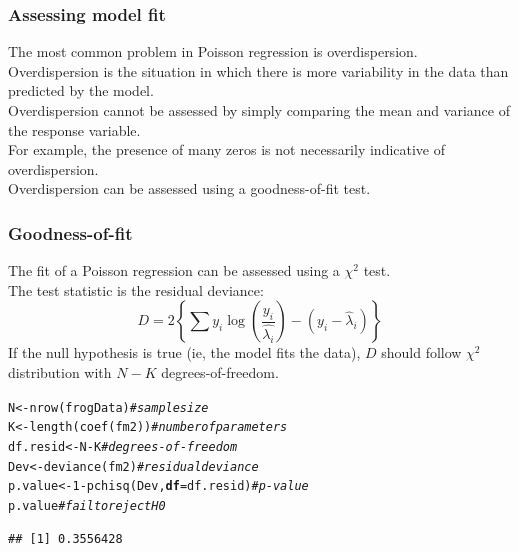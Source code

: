 \documentclass[color=usenames,dvipsnames]{beamer}\usepackage[]{graphicx}\usepackage[]{color}
\makeatletter
\newcommand{\hlnum}[1]{\textcolor[rgb]{0.69,0.494,0}{#1}}%
\newcommand{\hlcom}[1]{\textcolor[rgb]{0.514,0.506,0.514}{\textit{#1}}}%
\newcommand{\hlopt}[1]{\textcolor[rgb]{0,0,0}{#1}}%
\newcommand{\hlstd}[1]{\textcolor[rgb]{0,0,0}{#1}}%
\newcommand{\hlkwb}[1]{\textcolor[rgb]{0,0.341,0.682}{#1}}%
\newcommand{\hlkwc}[1]{\textcolor[rgb]{0,0,0}{\textbf{#1}}}%
\newcommand{\hlkwd}[1]{\textcolor[rgb]{0.004,0.004,0.506}{#1}}%
\newenvironment{kframe}{%
 \def\at@end@of@kframe{}%
 \ifinner\ifhmode%
  \def\at@end@of@kframe{\end{minipage}}%
  \begin{minipage}{\columnwidth}%
 \fi\fi%
 \def\FrameCommand##1{\hskip\@totalleftmargin \hskip-\fboxsep
 \colorbox{shadecolor}{##1}\hskip-\fboxsep
     \hskip-\linewidth \hskip-\@totalleftmargin \hskip\columnwidth}%
 \MakeFramed {\advance\hsize-\width
   \@totalleftmargin\z@ \linewidth\hsize
   \@setminipage}}%
 {\par\unskip\endMakeFramed%
 \at@end@of@kframe}
\newenvironment{knitrout}{}{} %
\makeatother
\begin{document}
\begin{frame}
  \frametitle{Assessing model fit}
  {The most common problem in Poisson regression is
    {\alert{overdispersion}}. \\}
  \pause
  \vfill
  {Overdispersion is the situation in which there is more variability
    in the data than predicted by the model. \\}
  \pause
  \vfill
  {Overdispersion cannot be assessed by simply comparing the mean and
    variance of the response variable. \\}
  \pause
  \vfill
  {For example, the presence of many zeros is not necessarily
    indicative of overdispersion. \\}
  \pause
  \vfill
  {Overdispersion can be assessed using a goodness-of-fit test. \\}
\end{frame}



\begin{frame}[fragile]
  \frametitle{Goodness-of-fit}
The fit of a Poisson regression can be assessed using a $\chi^2$
test. \\
\pause
\vfill
The test statistic is the residual deviance:
\[
  D = 2 \left\{\sum y_i \log\left(\frac{y_i}{\hat{\lambda_i}}\right) - (y_i-\hat{\lambda}_i)\right\}
\]
\pause
\vfill
If the null hypothesis is true (ie, the model fits the data), $D$ should
follow $\chi^2$ distribution with $N-K$ degrees-of-freedom.
\pause
\vfill
\begin{knitrout}\footnotesize
{}\color{fgcolor}\begin{kframe}
\begin{alltt}
\hlstd{N} \hlkwb{<-} \hlkwd{nrow}\hlstd{(frogData)}                   \hlcom{# sample size}
\hlstd{K} \hlkwb{<-} \hlkwd{length}\hlstd{(}\hlkwd{coef}\hlstd{(fm2))}                \hlcom{# number of parameters}
\hlstd{df.resid} \hlkwb{<-} \hlstd{N}\hlopt{-}\hlstd{K}                       \hlcom{# degrees-of-freedom}
\hlstd{Dev} \hlkwb{<-} \hlkwd{deviance}\hlstd{(fm2)}                  \hlcom{# residual deviance}
\hlstd{p.value} \hlkwb{<-} \hlnum{1}\hlopt{-}\hlkwd{pchisq}\hlstd{(Dev,} \hlkwc{df}\hlstd{=df.resid)} \hlcom{# p-value}
\hlstd{p.value}                               \hlcom{# fail to reject H0}
\end{alltt}
\begin{verbatim}
## [1] 0.3556428
\end{verbatim}
\end{kframe}
\end{knitrout}
\end{frame}
\end{document}
